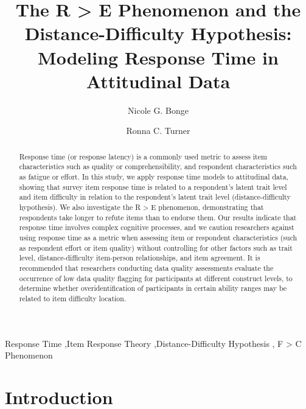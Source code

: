 \documentclass[
  number]{elsarticle}
\begin{document}
\begin{frontmatter}
\title{The R \textgreater{} E Phenomenon and the Distance-Difficulty
Hypothesis: Modeling Response Time in Attitudinal Data}
\author[1]{Nicole G. Bonge%
%
}
\author[1]{Ronna C. Turner%
%
}




        
\begin{abstract}
Response time (or response latency) is a commonly used metric to assess
item characteristics such as quality or comprehensibility, and
respondent characteristics such as fatigue or effort. In this study, we
apply response time models to attitudinal data, showing that survey item
response time is related to a respondent's latent trait level and item
difficulty in relation to the respondent's latent trait level
(distance-difficulty hypothesis). We also investigate the R
\textgreater{} E phenomenon, demonstrating that respondents take longer
to refute items than to endorse them. Our results indicate that response
time involves complex cognitive processes, and we caution researchers
against using response time as a metric when assessing item or
respondent characteristics (such as respondent effort or item quality)
without controlling for other factors such as trait level,
distance-difficulty item-person relationships, and item agreement. It is
recommended that researchers conducting data quality assessments
evaluate the occurrence of low data quality flagging for participants at
different construct levels, to determine whether overidentification of
participants in certain ability ranges may be related to item difficulty
location.
\end{abstract}





\begin{keyword}
    Response Time \sep Item Response Theory \sep Distance-Difficulty
Hypothesis \sep 
    F \textgreater{} C Phenomenon
\end{keyword}
\end{frontmatter}
    

\section{Introduction}\label{introduction}
\end{document}
